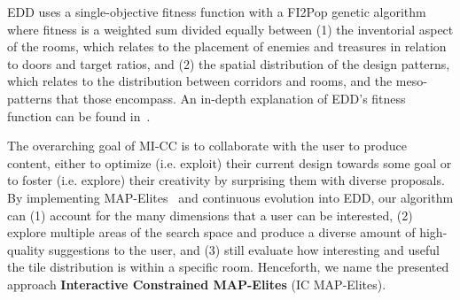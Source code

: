 

EDD uses a single-objective fitness function with a FI2Pop genetic algorithm where fitness is a weighted sum divided equally between (1) the inventorial aspect of the rooms, which relates to the placement of enemies and treasures in relation to doors and target ratios, and (2) the spatial distribution of the design patterns, which relates to the distribution between corridors and rooms, and the meso-patterns that those encompass. An in-depth explanation of EDD's fitness function can be found in~.

The overarching goal of MI-CC is to collaborate with the user to produce content, either to optimize (i.e. exploit) their current design towards some goal or to foster (i.e. explore) their creativity by surprising them with diverse proposals. By implementing MAP-Elites~ and continuous evolution into EDD, our algorithm can (1) account for the many dimensions that a user can be interested, (2) explore multiple areas of the search space and produce a diverse amount of high-quality suggestions to the user, and (3) still evaluate how interesting and useful the tile distribution is within a specific room. Henceforth, we name the presented approach \textbf{Interactive Constrained MAP-Elites} (IC MAP-Elites). 

